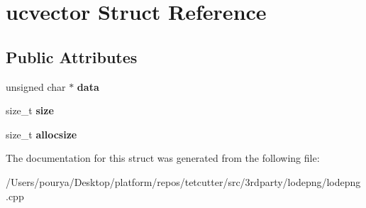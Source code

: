 \hypertarget{structucvector}{}\section{ucvector Struct Reference}
\label{structucvector}
\subsection*{Public Attributes}
\begin{DoxyCompactItemize}
\item 
\hypertarget{structucvector_ace794c5713208c5a20f21762cd87c919}{}unsigned char $\ast$ {\bfseries data}\label{structucvector_ace794c5713208c5a20f21762cd87c919}

\item 
\hypertarget{structucvector_a27c99c34de0c5b3ca0c242d402c69499}{}size\+\_\+t {\bfseries size}\label{structucvector_a27c99c34de0c5b3ca0c242d402c69499}

\item 
\hypertarget{structucvector_a235168baac13f0c78bd3e309dc170f90}{}size\+\_\+t {\bfseries allocsize}\label{structucvector_a235168baac13f0c78bd3e309dc170f90}

\end{DoxyCompactItemize}


The documentation for this struct was generated from the following file\+:\begin{DoxyCompactItemize}
\item 
/\+Users/pourya/\+Desktop/platform/repos/tetcutter/src/3rdparty/lodepng/lodepng.\+cpp\end{DoxyCompactItemize}
